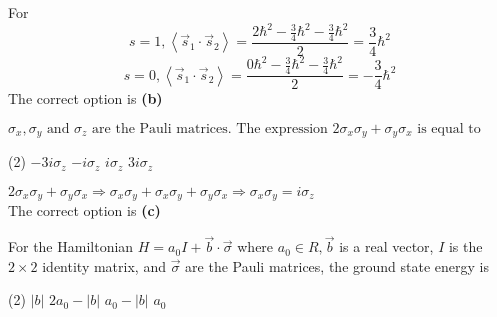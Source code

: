 \begin{enumerate}
\begin{answer}
	For $$s=1,\left\langle\vec{s}_{1} \cdot \vec{s}_{2}\right\rangle=\frac{2 \hbar^{2}-\frac{3}{4} \hbar^{2}-\frac{3}{4} \hbar^{2}}{2}=\frac{3}{4} \hbar^{2}$$
	$$
	s=0,\left\langle\vec{s}_{1} \cdot \vec{s}_{2}\right\rangle=\frac{0 \hbar^{2}-\frac{3}{4} \hbar^{2}-\frac{3}{4} \hbar^{2}}{2}=-\frac{3}{4} \hbar^{2}
	$$
	The correct option is \textbf{(b)}
\end{answer}
\begin{minipage}{\textwidth}
	\item $\sigma_{x}, \sigma_{y} \text { and } \sigma_{z} \text { are the Pauli matrices. The expression } 2 \sigma_{x} \sigma_{y}+\sigma_{y} \sigma_{x} \text { is equal to }$
\end{minipage}
\begin{tasks}(2)
	\task[\textbf{A.}] $-3 i \sigma_{z}$
	\task[\textbf{B.}]$-i \sigma_{z}$
	\task[\textbf{C.}]$i \sigma_{z}$
	\task[\textbf{D.}]$3 i \sigma_{z}$
\end{tasks}
\begin{answer}
	$2 \sigma_{x} \sigma_{y}+\sigma_{y} \sigma_{x} \Rightarrow \sigma_{x} \sigma_{y}+\sigma_{x} \sigma_{y}+\sigma_{y} \sigma_{x} \Rightarrow \sigma_{x} \sigma_{y}=i \sigma_{z}$\\
	The correct option is \textbf{(c)}
\end{answer}
\begin{minipage}{\textwidth}
	\item For the Hamiltonian $H=a_{0} I+\vec{b} \cdot \vec{\sigma}$ where $a_{0} \in R, \vec{b}$ is a real vector, $I$ is the $2 \times 2$ identity matrix, and $\vec{\sigma}$ are the Pauli matrices, the ground state energy is
\end{minipage}
\begin{tasks}(2)
	\task[\textbf{A.}] $|b|$
	\task[\textbf{B.}]$2 a_{0}-|b|$
	\task[\textbf{C.}]$a_{0}-|b|$
	\task[\textbf{D.}]$a_{0}$
\end{tasks}
\end{enumerate}
